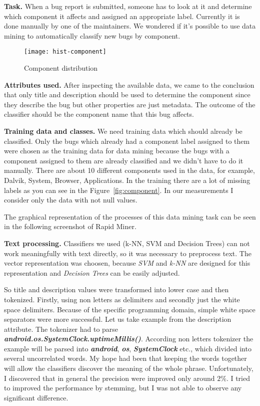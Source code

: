 
{\bf Task.} When a bug report is submitted, someone has to look at it and determine which component it affects and assigned an appropriate label. Currently it is done manually by one of the maintainers. We wondered if it's possible to use data mining to automatically classify new bugs by component.

\begin{figure}[!htp]
\begin{center} 
\texttt{[image: hist-component]}
\caption{Component distribution}
\end{center}
\end{figure}

{\bf Attributes used.} After inspecting the available data, we came to the conclusion that only title and description should be used to determine the component since they describe the bug but other properties are just metadata. The outcome of the classifier should be the component name that this bug affects.

{\bf Training data and classes.} We need training data which should already be classified. Only the bugs which already had a component label assigned to them were chosen as the training data for data mining because the bugs with a component assigned to them are already classified and we didn't have to do it manually. There are about 10 different components used in the data, for example, Dalvik, System, Browser, Applications.
In the training there are a lot of missing labels as you can see in the  Figure~\ref{fig:component}. In our measurements I consider only the data with not null values.

The graphical representation of the processes of this data mining task can be seen in the following screenshot of Rapid Miner.


{\bf Text processing.} Classifiers we used (k-NN, SVM and Decision Trees) can not work meaningfully with text directly, so it was necessary to preprocess text. The vector representation was choosen, because {\it SVM} and {\it k-NN} are designed for this representation and {\it Decision Trees} can be easily adjusted.

So title and description values were transformed into lower case
and then tokenized. Firstly, using non letters as delimiters and
secondly just the white space delimiters. Because of the
specific programming domain, simple white space separators were
more successful. Let us take example from the description
attribute. The tokenizer had to parse {\bf {\it
android.os.SystemClock.uptimeMillis()}}. According non letters
tokenizer the example will be parsed into {\bf {\it android}},
{\bf {\it os}}, {\bf {\it SystemClock}} etc., which divided into
several uncorrelated words. My hope had been that keeping the
words together will allow the classifiers discover the meaning
of the whole phrase. Unfortunately, I discovered that in general
the precision were improved only around $2\%$. I tried to
improved the performance by stemming, but I was not able to
observe any significant difference.

